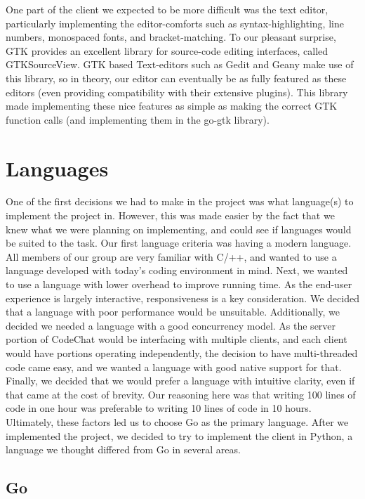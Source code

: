 \documentclass[12pt, letterpaper]{article}
\begin{document}
One part of the client we expected to be more difficult was the text 
editor, particularly implementing the editor-comforts such as 
syntax-highlighting, line numbers, monospaced fonts, and 
bracket-matching. To our pleasant surprise, GTK provides an excellent 
library for source-code editing interfaces, called GTKSourceView. GTK 
based Text-editors such as Gedit and Geany make use of this library, so 
in theory, our editor can eventually be as fully featured as these 
editors (even providing compatibility with their extensive plugins). 
This library made implementing these nice features as simple as making 
the correct GTK function calls (and implementing them in the go-gtk 
library).

\section*{Languages}

One of the first decisions we had to make in the project was what
language(s) to implement the project in. However, this was made easier
by the fact that we knew what we were planning on implementing, and
could see if languages would be suited to the task. Our first language
criteria was having a modern language. All members of our group are
very familiar with C/++, and wanted to use a language developed with
today's coding environment in mind. Next, we wanted to use a language
with lower overhead to improve running time. As the end-user experience
is largely interactive, responsiveness is a key consideration. We
decided that a language with poor performance would be unsuitable.
Additionally, we decided we needed a language with a good concurrency
model. As the server portion of CodeChat would be interfacing with
multiple clients, and each client would have portions operating
independently, the decision to have multi-threaded code came easy, and
we wanted a language with good native support for that. Finally, we
decided that we would prefer a language with intuitive clarity, even if
that came at the cost of brevity. Our reasoning here was that writing
100 lines of code in one hour was preferable to writing 10 lines of
code in 10 hours. Ultimately, these factors led us to choose Go as the
primary language. After we implemented the project, we decided to try
to implement the client in Python, a language we thought differed from
Go in several areas.


\subsection*{Go}
\end{document}
